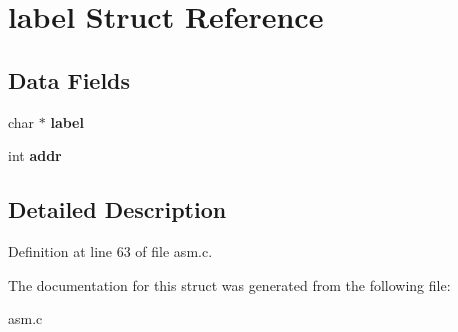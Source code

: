 \section{label Struct Reference}
\label{structlabel}
\subsection*{Data Fields}
\begin{DoxyCompactItemize}
\item 
\mbox{\label{structlabel_acf60de4c64d60c1b9449c056bc6bfcf7}} 
char $\ast$ {\bfseries label}
\item 
\mbox{\label{structlabel_aafb8164f20f79a2dd0290502a25367d1}} 
int {\bfseries addr}
\end{DoxyCompactItemize}


\subsection{Detailed Description}


Definition at line 63 of file asm.\+c.



The documentation for this struct was generated from the following file\+:\begin{DoxyCompactItemize}
\item 
asm.\+c\end{DoxyCompactItemize}
